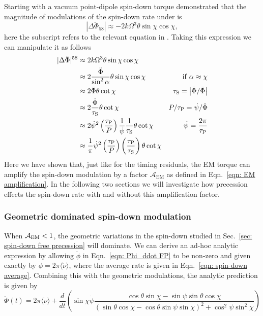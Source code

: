 \documentclass[../full_thesis/full_thesis.tex]{subfiles}
\begin{document}
Starting with a vacuum point-dipole spin-down torque \citet{Jones2001}
demonstrated that the magnitude of modulations of the spin-down rate under is
\begin{equation}
    |\Delta\ddot{\Phi}_{58}| \approx -2k\Omega^{3} \theta \sin\chi \cos\chi,
\end{equation}
here the subscript refers to the relevant equation in \citet{Jones2001}. Taking
this expression we can manipulate it as follows
\begin{align}
    |\Delta\ddot{\Phi}|^{58}
    & \approx 2k\Omega^{3} \theta \sin\chi \cos\chi & \\
    & \approx 2 \frac{\ddot{\Phi}}{\sin^{2}\alpha} \theta \sin\chi\cos\chi &
    \mathrm{if }\; \alpha \approx \chi \\
    & \approx 2 \ddot{\Phi}\theta \cot\chi &
    \tau_{\mathrm{S}} = \left| \dot{\Phi} / \ddot{\Phi}\right| \\
    & \approx 2 \frac{\dot{\Phi}}{\tau_{\mathrm{S}}} \theta \cot\chi &
    P/\tau_{\mathrm{P}} = \dot{\psi}/\dot{\Phi} \\
    & \approx 2 \dot{\psi}^{2}\left(\frac{\tau_{\mathrm{P}}}{P}\right) \frac{1}{\dot{\psi}} \frac{1}{\tau_{\mathrm{S}}} \theta \cot \chi & \dot{\psi} = \frac{2\pi}{\tau_{\mathrm{P}}} \\
    & \approx \frac{1}{\pi}\dot{\psi}^{2}\left(\frac{\tau_{\mathrm{P}}}{P}\right)\left(\frac{\tau_{\mathrm{P}}}{\tau_{\mathrm{S}}}\right) \theta \cot\chi
    \label{eqn: spin-down variations FP EM}
\end{align}
Here we have shown that, just like for the timing residuals, the EM torque can
amplify the spin-down modulation by a factor $\mathcal{A}_{\mathrm{EM}}$ as
defined in Eqn.~\eqref{eqn: EM amplification}. In the following two sections
we will investigate how precession effects the spin-down rate with and without
this amplification factor.

\subsubsection{Geometric dominated spin-down modulation}

When $\mathcal{A}_{\mathrm{EM}} < 1$, the geometric variations in the
spin-down studied in Sec.~\ref{sec: spin-down free precession} will dominate.
We can derive an ad-hoc analytic expression by allowing
$\ddot{\phi}$ in Eqn.~\eqref{eqn: Phi_ddot FP} to be non-zero and given
exactly by $\ddot{\phi} = 2\pi\langle\dot{\nu}\rangle$, where the average
rate is given in Eqn.~\eqref{eqn: spin-down average}. Combining this with the
geometric modulations, the analytic prediction is given by
\begin{equation}
    \ddot{\Phi}(t) = 2\pi \langle\dot{\nu}\rangle + \frac{d}{dt}\left(
        \sin\chi\dot{\psi} \frac{\cos\theta\sin\chi - \sin \psi \sin \theta \cos\chi
}{(\sin\theta \cos \chi - \cos \theta \sin \psi \sin \chi)^{2} + \cos^{2}\psi \sin^{2} \chi}
\right)
\label{eqn: 1238}
\end{equation}
\end{document}
